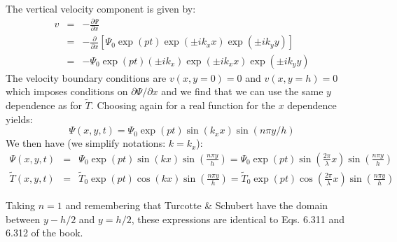 The vertical velocity component is given by:
\begin{eqnarray}
v &=& -\frac{\partial \Psi}{\partial x}  \\
  &=& -\frac{\partial }{\partial x} \left[  \Psi_0 \exp(pt)\exp(\pm i k_x x) \exp(\pm i k_y y) \right] \\
  &=& - \Psi_0 \exp(pt) (\pm i k_x) \exp(\pm i k_x x) \exp(\pm i k_y y)
\end{eqnarray}
The velocity boundary conditions are $v(x,y=0)=0$ and $v(x,y=h)=0$ 
which imposes conditions on $\partial \Psi/\partial x$ and we find that we 
can use the same $y$ dependence as for $\tilde{T}$. 
Choosing again for a real function for the $x$ dependence yields:
\[
\Psi(x,y,t) = \Psi_0 \exp(pt) \sin(k_x x) \sin(n\pi y/h)
\]
We then have (we simplify notations: $k=k_x$):
\begin{eqnarray}
\Psi(x,y,t) 
&=& \Psi_0 \exp(pt)  \sin(k x) \sin(\frac{n\pi y}{h})   
= \Psi_0 \exp(pt)  \sin(\frac{2\pi}{\lambda} x) \sin(\frac{n\pi y}{h})  \\ 
\tilde{T}(x,y,t)  
&=& \tilde{T}_0 \exp(pt)  \cos(k x) \sin(\frac{n\pi y}{h})   
= \tilde{T}_0 \exp(pt)  \cos(\frac{2\pi}{\lambda} x) \sin(\frac{n\pi y}{h})   
\end{eqnarray}
\begin{remark}
Taking $n=1$ and remembering that Turcotte \& Schubert have the domain between 
$y-h/2$ and $y=h/2$, these expressions are identical to Eqs. 6.311 and 6.312 
of the book. 
\end{remark}



